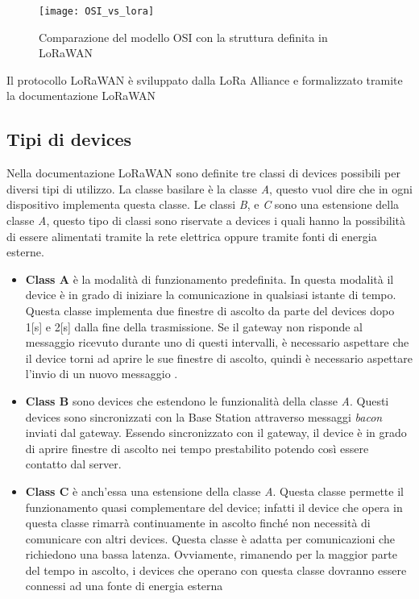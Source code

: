 \begin{figure}[h]
\centering 
\texttt{[image: OSI\_vs\_lora]}
\caption{Comparazione del modello OSI con la struttura definita in LoRaWAN}
\label{}
\end{figure}

Il protocollo LoRaWAN è sviluppato dalla LoRa Alliance e formalizzato tramite la
documentazione LoRaWAN 
\subsection{Tipi di devices}
Nella documentazione LoRaWAN sono definite tre classi di devices possibili per
diversi tipi di utilizzo. La classe basilare è la classe \emph{A}, questo vuol
dire che in ogni dispositivo implementa questa classe. Le classi \emph{B}, e
\emph{C} sono una estensione della classe \emph{A}, questo tipo di classi sono
riservate a devices i quali hanno la possibilità di essere alimentati tramite la
rete elettrica oppure tramite fonti di energia esterne.
\begin{itemize}
        \item   \textbf{Class A} è la modalità di funzionamento predefinita. 
                In questa
                modalità il device è in grado di iniziare la comunicazione in qualsiasi istante
                di tempo. Questa classe implementa due finestre di ascolto da parte del devices
                dopo 1[s] e 2[s] dalla fine della trasmissione. Se il gateway non risponde al
                messaggio ricevuto durante uno di questi intervalli, è necessario aspettare che
                il device torni ad aprire le sue finestre di ascolto, quindi è necessario
                aspettare l'invio di un nuovo messaggio .
        \item   \textbf{Class B} sono devices che estendono le funzionalità della classe
                \emph{A}. Questi devices sono sincronizzati con la Base Station attraverso
                messaggi \emph{bacon} inviati dal gateway. Essendo sincronizzato con il gateway,
                il device è in grado di aprire finestre di ascolto nei tempo prestabilito
                potendo così essere contatto dal server.
        \item   \textbf{Class C} è anch'essa una estensione della classe \emph{A}. 
                Questa classe permette il funzionamento quasi complementare del device; infatti
                il device che opera in questa classe rimarrà continuamente in ascolto finché non
                necessità di comunicare con altri devices. Questa classe è adatta per
                comunicazioni che richiedono una bassa latenza. Ovviamente, rimanendo per la
                maggior parte del tempo in ascolto, i devices che operano con questa classe
                dovranno essere connessi ad una fonte di energia esterna 
\end{itemize}


